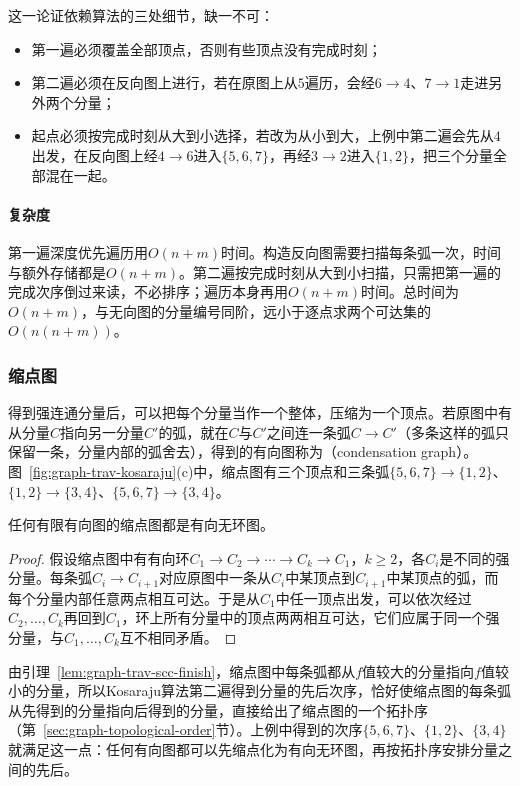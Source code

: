 这一论证依赖算法的三处细节，缺一不可：
\begin{itemize}
  \item 第一遍必须覆盖全部顶点，否则有些顶点没有完成时刻；
  \item 第二遍必须在反向图上进行，若在原图上从$5$遍历，会经$6\to4$、$7\to1$走进另外两个分量；
  \item 起点必须按完成时刻从大到小选择，若改为从小到大，上例中第二遍会先从$4$出发，在反向图上经$4\to6$进入$\{5,6,7\}$，再经$3\to2$进入$\{1,2\}$，把三个分量全部混在一起。
\end{itemize}

\paragraph{复杂度}
第一遍深度优先遍历用$O(n+m)$时间。构造反向图需要扫描每条弧一次，时间与额外存储都是$O(n+m)$。第二遍按完成时刻从大到小扫描，只需把第一遍的完成次序倒过来读，不必排序；遍历本身再用$O(n+m)$时间。总时间为$O(n+m)$，与无向图的分量编号同阶，远小于逐点求两个可达集的$O(n(n+m))$。

\subsubsection{缩点图}
\label{sec:graph-trav-condensation}

得到强连通分量后，可以把每个分量当作一个整体，压缩为一个顶点。若原图中有从分量$C$指向另一分量$C'$的弧，就在$C$与$C'$之间连一条弧$C\to C'$（多条这样的弧只保留一条，分量内部的弧舍去），得到的有向图称为（condensation graph）。图~\ref{fig:graph-trav-kosaraju}(c)中，缩点图有三个顶点和三条弧$\{5,6,7\}\to\{1,2\}$、$\{1,2\}\to\{3,4\}$、$\{5,6,7\}\to\{3,4\}$。

\begin{theorem}[缩点图无环]
\label{thm:graph-trav-condensation-dag}
任何有限有向图的缩点图都是有向无环图。
\end{theorem}

\begin{proof}
假设缩点图中有有向环$C_1\to C_2\to\cdots\to C_k\to C_1$，$k\geq2$，各$C_i$是不同的强分量。每条弧$C_i\to C_{i+1}$对应原图中一条从$C_i$中某顶点到$C_{i+1}$中某顶点的弧，而每个分量内部任意两点相互可达。于是从$C_1$中任一顶点出发，可以依次经过$C_2,\ldots,C_k$再回到$C_1$，环上所有分量中的顶点两两相互可达，它们应属于同一个强分量，与$C_1,\ldots,C_k$互不相同矛盾。
\end{proof}

由引理~\ref{lem:graph-trav-scc-finish}，缩点图中每条弧都从$f$值较大的分量指向$f$值较小的分量，所以Kosaraju算法第二遍得到分量的先后次序，恰好使缩点图的每条弧从先得到的分量指向后得到的分量，直接给出了缩点图的一个拓扑序（第~\ref{sec:graph-topological-order}节）。上例中得到的次序$\{5,6,7\}$、$\{1,2\}$、$\{3,4\}$就满足这一点：任何有向图都可以先缩点化为有向无环图，再按拓扑序安排分量之间的先后。
